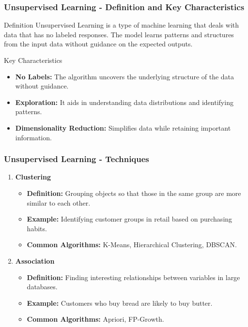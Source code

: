 \documentclass[aspectratio=169]{beamer}
\begin{document}
\begin{frame}[fragile]
    \frametitle{Unsupervised Learning - Definition and Key Characteristics}
    \begin{block}{Definition}
        Unsupervised Learning is a type of machine learning that deals with data that has no labeled responses. The model learns patterns and structures from the input data without guidance on the expected outputs.
    \end{block}

    \begin{block}{Key Characteristics}
        \begin{itemize}
            \item \textbf{No Labels:} The algorithm uncovers the underlying structure of the data without guidance.
            \item \textbf{Exploration:} It aids in understanding data distributions and identifying patterns.
            \item \textbf{Dimensionality Reduction:} Simplifies data while retaining important information.
        \end{itemize}
    \end{block}
\end{frame}

\begin{frame}[fragile]
    \frametitle{Unsupervised Learning - Techniques}
    \begin{enumerate}
        \item \textbf{Clustering}
            \begin{itemize}
                \item \textbf{Definition:} Grouping objects so that those in the same group are more similar to each other.
                \item \textbf{Example:} Identifying customer groups in retail based on purchasing habits.
                \item \textbf{Common Algorithms:} K-Means, Hierarchical Clustering, DBSCAN.
            \end{itemize}
        
        \item \textbf{Association}
            \begin{itemize}
                \item \textbf{Definition:} Finding interesting relationships between variables in large databases.
                \item \textbf{Example:} Customers who buy bread are likely to buy butter.
                \item \textbf{Common Algorithms:} Apriori, FP-Growth.
            \end{itemize}
    \end{enumerate}
\end{frame}
\end{document}
